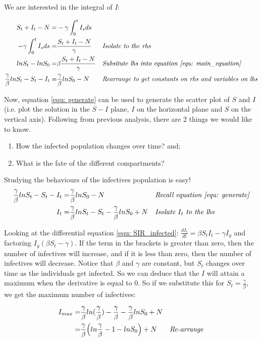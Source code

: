 \documentclass[fontsize=17pt]{article}
\begin{document}
We are interested in the integral of $I$:

 \begin{align}
S_{t}+I_{t}-N=&-\gamma\int_{0}^{t} I_{s}ds&& \\
-\gamma\int_{0}^{t} I_{s}ds=&\frac{S_{t}+I_{t}-N}{\gamma}&& \text{\textit{Isolate to the rhs}}\\
lnS_{t}-lnS_{0}=&\beta\frac{S_{t}+I_{t}-N}{\gamma}&&\text{\textit{Subsitute lhs into equation \ref{equ: main_equation}}}\\ \label{equ: generate}
\frac{\gamma}{\beta}lnS_{t}-S_{t}-I_{t}=&\frac{\gamma}{\beta}lnS_{0}-N&&\text{\textit{Rearrange to get constants on rhs and variables on lhs}}
\end{align}

Now, equation \ref{equ: generate} can be used to generate the scatter plot of $S$ and $I$ (i.e. plot the solution in the $S-I$ plane, $I$ on the horizontal plane and $S$ on the vertical axis). Following from previous analysis, there are 2 things we would like to know.
\begin{enumerate}
	\item How the infected population changes over time? and;
	\item What is the fate of the different compartments?
\end{enumerate}

Studying the behaviours of the infectives population is easy!
 \begin{align}
\frac{\gamma}{\beta}lnS_{t}-S_{t}-I_{t}=&\frac{\gamma}{\beta}lnS_{0}-N&&\text{\textit{Recall equation \ref{equ: generate}}}\\
I_{t}=&\frac{\gamma}{\beta}lnS_{t}-S_{t}-\frac{\gamma}{\beta}lnS_{0}+N&&\text{\textit{Isolate $I_{t}$ to the lhs}}
\end{align}

Looking at the differential equation \ref{equ: SIR_infected}: $\frac{dI_{t}}{dt}=\beta S_{t}I_{t}-\gamma I_{y}$ and factoring $ I_{y}(\beta S_{t}-\gamma)$. If the term in the brackets is greater than zero, then the number of infectives will increase, and if it is less than zero, then the number of infectives will decrease. Notice that $\beta$ and $\gamma$ are constant, but $S_t$ changes over time as the individuals get infected. So we can deduce that the $I$ will attain a maximum when the derivative is equal to 0. So if we substitute this for $S_{t}=\frac{\gamma}{\beta}$, we get the maximum number of infectives:

 \begin{align}
I_{max}=&\frac{\gamma}{\beta}ln(\frac{\gamma}{\beta})-\frac{\gamma}{\beta}-\frac{\gamma}{\beta}lnS_{0} +N&&\\
=&\frac{\gamma}{\beta}\Bigl(ln\frac{\gamma}{\beta}-1-lnS_{0}\Bigr)+N&&\text{\textit{Re-arrange}}
\end{align}
\end{document}
